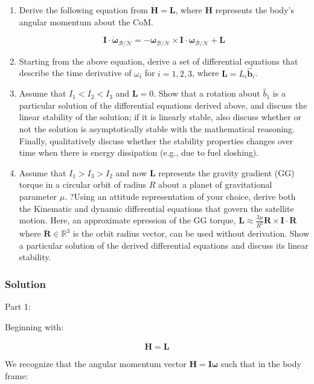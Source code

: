 \documentclass[
]{article}
\begin{document}
\begin{enumerate}
\item
  Derive the following equation from
  \(\dot{\boldsymbol{H}} = \boldsymbol{L}\), where \(\boldsymbol{H}\)
  represents the body's angular momentum about the CoM.

  \[\boldsymbol{I} \cdot \dot{\boldsymbol{\omega}}_\mathcal{B/N} = -\boldsymbol{\omega}_\mathcal{B/N} \times \boldsymbol{I} \cdot \boldsymbol{\omega}_\mathcal{B/N} + \boldsymbol{L}\]
\item
  Starting from the above equation, derive a set of differential
  equations that describe the time derivative of \(\omega_i\) for
  \(i = 1,2,3\), where \(\boldsymbol{L} = L_i \hat{\boldsymbol{b}}_i\).
\item
  Assume that \(I_1 < I_2 < I_3\) and \(\boldsymbol{L} = 0\). Show that
  a rotation about \(\hat{b}_1\) is a particular solution of the
  differential equations derived above, and discuss the linear stability
  of the solution; if it is linearly stable, also discuss whether or not
  the solution is asymptotically stable with the mathematical reasoning.
  Finally, qualitatively discuss whether the stability properties
  changes over time when there is energy dissipation (e.g., due to fuel
  sloshing).
\item
  Assume that \(I_1 > I_3 > I_2\) and now \(\boldsymbol{L}\) represents
  the gravity gradient (GG) torque in a circular orbit of radius \(R\)
  about a planet of gravitational parameter \(\mu\). ?Using an attitude
  representation of your choice, derive both the Kinematic and dynamic
  differential equations that govern the satellite motion. Here, an
  approximate epression of the GG torque,
  \(\boldsymbol{L} \approx \frac{3\mu}{R^5} \boldsymbol{R} \times \boldsymbol{I} \cdot \boldsymbol{R}\)
  where \(\boldsymbol{R} \in \mathbb{R}^3\) is the orbit radius vector,
  can be used without derivation. Show a particular solution of the
  derived differential equations and discuss its linear stability.
\end{enumerate}

\subsubsection{Solution}\label{solution-4}

Part 1:

Beginning with:

\[\dot{\boldsymbol{H}} = \boldsymbol{L}\]

We recognize that the angular momentum vector
\(\boldsymbol{H} = \boldsymbol{I} \boldsymbol{\omega}\) such that in the
body frame:
\end{document}

